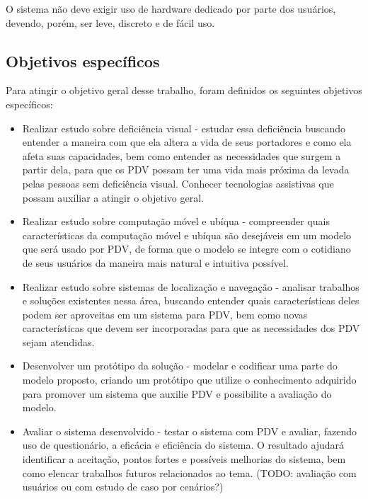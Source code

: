 \documentclass[english,brazilian]{UNISINOSmonografia}
\begin{document}
		O sistema não deve exigir uso de hardware dedicado por parte dos usuários, devendo, porém, ser leve, discreto e de fácil uso.
		
		\subsection{Objetivos específicos}
		Para atingir o objetivo geral desse trabalho, foram definidos os seguintes objetivos específicos:

		\begin{itemize}
			\item Realizar estudo sobre deficiência visual - estudar essa deficiência buscando entender a maneira com que ela altera a vida de seus portadores e como ela afeta suas capacidades, bem como entender as necessidades que surgem a partir dela, para que os PDV possam ter uma vida mais próxima da levada pelas pessoas sem deficiência visual. Conhecer tecnologias assistivas que possam auxiliar a atingir o objetivo geral.

			\item Realizar estudo sobre computação móvel e ubíqua - compreender quais características da computação móvel e ubíqua são desejáveis em um modelo que será usado por PDV, de forma que o modelo se integre com o cotidiano de seus usuários da maneira mais natural e intuitiva possível.

			\item Realizar estudo sobre sistemas de localização e navegação - analisar trabalhos e soluções existentes nessa área, buscando entender quais características deles podem ser aproveitas em um sistema para PDV, bem como novas características que devem ser incorporadas para que as necessidades dos PDV sejam atendidas.

			\item Desenvolver um protótipo da solução - modelar e codificar uma parte do modelo proposto, criando um protótipo que utilize o conhecimento adquirido para promover um sistema que auxilie PDV e 
			possibilite a avaliação do modelo.

			\item Avaliar o sistema desenvolvido - testar o sistema com PDV e avaliar, fazendo uso de questionário, a eficácia e eficiência do sistema. O resultado ajudará identificar a aceitação, pontos fortes e possíveis melhorias do sistema, bem como elencar trabalhos futuros relacionados ao tema. (TODO: avaliação com usuários ou com estudo de caso por cenários?) 
		\end{itemize}
\end{document}
